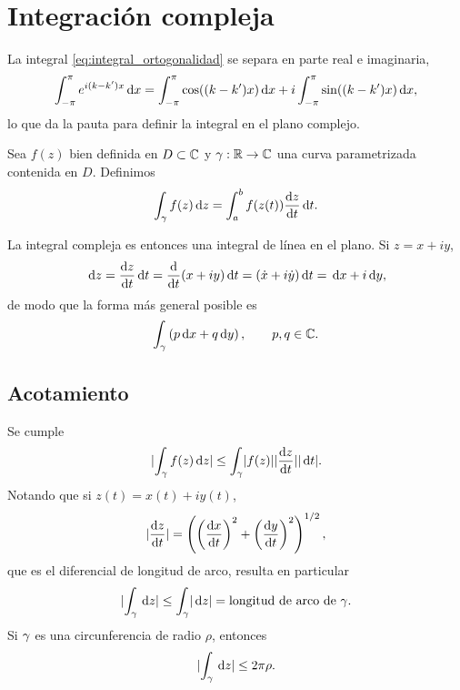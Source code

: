 \section{Integraci\'on compleja}
\label{sec:integracion_compleja}

La integral \eqref{eq:integral_ortogonalidad} se separa en parte real e
imaginaria,
\begin{equation}
  \label{eq:separacion_integral}
  \small
  \int_{-\pi}^{\pi}e^{i(k-k')x}\,\mathrm{d} x
    =\int_{-\pi}^{\pi}\cos((k-k')x)\,\mathrm{d} x
    +i\int_{-\pi}^{\pi}\sin((k-k')x)\,\mathrm{d} x,
\end{equation}
lo que da la pauta para definir la integral en el plano complejo.

\begin{definicion}
  \label{def:integral_compleja}
  Sea $f(z)$ bien definida en $D\subset\mathbb{C}$ y $\gamma:\mathbb{R}\rightarrow\mathbb{C}$ una curva
  parametrizada contenida en $D$. Definimos
  \begin{equation}
    \label{eq:integral_compleja}
    \int_{\gamma}f(z)\,\mathrm{d} z=\int_{a}^{b}f(z(t))\frac{\mathrm{d}z}{\mathrm{d}t}\,\mathrm{d} t .
  \end{equation}
\end{definicion}

La integral compleja es entonces una integral de l\'inea en el plano. Si
$z=x+iy$,
\begin{equation}
  \label{eq:dz}
  \,\mathrm{d} z=\frac{\mathrm{d}z}{\mathrm{d}t}\,\mathrm{d} t=\frac{\mathrm{d}}{\mathrm{d}t}(x+iy)\,\mathrm{d} t
    =(\dot{x}+i\dot{y})\,\mathrm{d} t=\,\mathrm{d} x+i\,\mathrm{d} y,
\end{equation}
de modo que la forma m\'as general posible es
\begin{equation}
  \label{eq:forma_general_integral}
  \int_{\gamma}\left( p\,\mathrm{d} x+q\,\mathrm{d} y \right),
  \qquad p,q\in\mathbb{C} .
\end{equation}

\subsection{Acotamiento}
\label{subsec:acotamiento_integral}

Se cumple
\begin{equation}
  \label{eq:cota_integral}
  \lvert \int_{\gamma}f(z)\,\mathrm{d} z \rvert
    \le\int_{\gamma}\lvert f(z) \rvert\lvert \frac{\mathrm{d}z}{\mathrm{d}t} \rvert\lvert \,\mathrm{d} t \rvert .
\end{equation}
Notando que si $z(t)=x(t)+iy(t)$,
\begin{equation}
  \label{eq:diferencial_arco_complejo}
  \lvert \frac{\mathrm{d}z}{\mathrm{d}t} \rvert
    =\left( \left( \frac{\mathrm{d}x}{\mathrm{d}t} \right)^2+\left( \frac{\mathrm{d}y}{\mathrm{d}t} \right)^2 \right)^{1/2},
\end{equation}
que es el diferencial de longitud de arco, resulta en particular
\begin{equation}
  \label{eq:cota_longitud}
  \lvert \int_{\gamma}\,\mathrm{d} z \rvert\le\int_{\gamma}\lvert \,\mathrm{d} z \rvert
    =\text{longitud de arco de }\gamma .
\end{equation}
Si $\gamma$ es una circunferencia de radio $\rho$, entonces
\begin{equation}
  \label{eq:cota_circulo}
  \lvert \int_{\gamma}\,\mathrm{d} z \rvert\le 2\pi\rho .
\end{equation}

